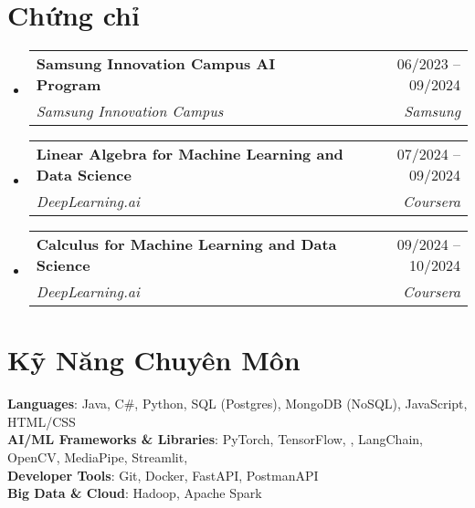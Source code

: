 \documentclass[letterpaper,11pt]{article}
\makeatletter
\newcommand{\resumeSubheading}[4]{
	\vspace{-2pt}\item
	\begin{tabular*}{0.97\textwidth}[t]{l@{\extracolsep{\fill}}r}
		\textbf{#1} & #2 \\
		\textit{\small#3} & \textit{\small #4} \\
	\end{tabular*}\vspace{-7pt}
}
\newcommand{\resumeSubHeadingListStart}{\begin{itemize}[leftmargin=0.15in, label={}]}
\newcommand{\resumeSubHeadingListEnd}{\end{itemize}}
\makeatother
\begin{document}
\section{Chứng chỉ}
	\resumeSubHeadingListStart
		\resumeSubheading
			{Samsung Innovation Campus AI Program}{06/2023 -- 09/2024}
			{Samsung Innovation Campus}{Samsung}

		\resumeSubheading
			{Linear Algebra for Machine Learning and Data Science}{07/2024 -- 09/2024}
			{DeepLearning.ai}{Coursera}

		\resumeSubheading
			{Calculus for Machine Learning and Data Science} {09/2024 -- 10/2024}
			{DeepLearning.ai}{Coursera}
	\resumeSubHeadingListEnd

\section{Kỹ Năng Chuyên Môn}
\begin{itemize}[leftmargin=0.15in, label={}]
\small{\item{
	\textbf{Languages}{: Java, C\#, Python, SQL (Postgres), MongoDB (NoSQL), JavaScript, HTML/CSS} \\
	\textbf{AI/ML Frameworks \& Libraries}{: PyTorch, TensorFlow, , LangChain, OpenCV, MediaPipe, Streamlit, } \\
	\textbf{Developer Tools}{: Git, Docker, FastAPI, PostmanAPI} \\
	\textbf{Big Data \& Cloud}{: Hadoop, Apache Spark}
}}
\end{itemize}
\end{document}
